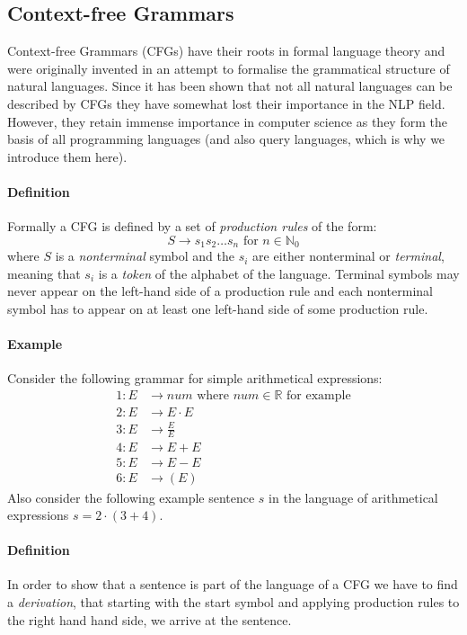 \documentclass[11pt]{article}
\newcommand {\N} {\mathbb{N}}
\newcommand {\R} {\mathbb{R}}
\begin{document}
\subsection{Context-free Grammars}
\label{ssec:cfg}
Context-free Grammars (CFGs) have their roots in formal language theory and were originally invented in an attempt to formalise the grammatical structure of natural languages. Since it has been shown that not all natural languages can be described by CFGs they have somewhat lost their importance in the NLP field. However, they retain immense importance in computer science as they form the basis of all programming languages (and also query languages, which is why we introduce them here).
\paragraph{Definition}
Formally a CFG is defined by a set of \emph{production rules} of the form:
\begin{equation*}
S \to s_1s_2\ldots s_n \mbox{ for } n\in\N_0
\end{equation*}
where $S$ is a \emph{nonterminal} symbol and the $s_i$ are either nonterminal or \emph{terminal}, meaning that $s_i$ is a \emph{token} of the alphabet of the language. Terminal symbols may never appear on the left-hand side of a production rule and each nonterminal symbol has to appear on at least one left-hand side of some production rule.

\paragraph{Example}
Consider the following grammar for simple arithmetical expressions:
\begin{align*}
1: E &\to num \mbox{ where } num\in\R \mbox{ for example} \\
2: E &\to E\cdot E \\
3: E &\to \frac{E}{E}\\
4: E &\to E+E \\
5: E &\to E-E \\
6: E &\to ( E )
\end{align*}
Also consider the following example sentence $s$ in the language of arithmetical expressions $s=2\cdot(3+4)$.

\paragraph{Definition}
In order to show that a sentence is part of the language of a CFG we have to find a \emph{derivation}, that starting with the start symbol and applying production rules to the right hand hand side, we arrive at the sentence.
\end{document}
